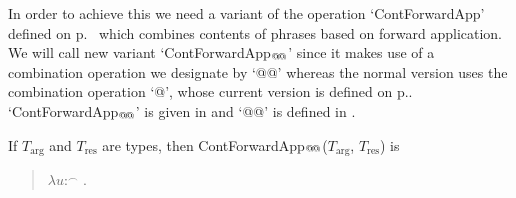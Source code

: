 In order to achieve this we need a variant of the operation
`ContForwardApp' defined on p.~\pageref{ex:ContForwardApp@} which
combines contents of phrases based on forward application. We will
call new variant `ContForwardApp$_{\text{@\!@}}$' since it makes use of a
combination operation we designate by `@\!@' whereas the normal version
uses the combination operation `@', whose current version is defined
on p.\pageref{ex:s-combination}.  `ContForwardApp$_{\text{@\!@}}$' is given in
 and `@\!@' is defined in .
\begin{ex} 
\begin{subex} 
 

 
\item If $T_{\text{arg}}$ and $T_{\text{res}}$ are types, then
  ContForwardApp$_{\text{@\!@}}$($T_{\text{arg}}$, $T_{\text{res}}$) is
\begin{quote}
  $\lambda
u$:$^{\frown}$ . \\
\hspace*{2em}

\end{quote}


\end{subex}
\end{ex}
